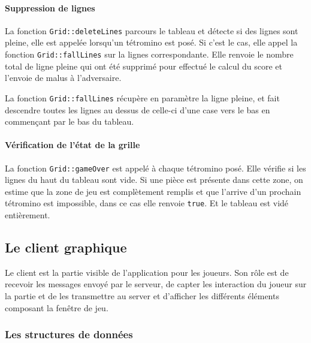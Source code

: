 \documentclass[a4paper, 12pt]{article}
\begin{document}
			\paragraph{Suppression de lignes}
				La fonction \texttt{Grid::deleteLines} parcours le tableau et détecte si des lignes sont pleine, elle est appelée lorsqu'un tétromino est posé.
				Si c’est le cas, elle appel la fonction \texttt{Grid::fallLines} sur la lignes correspondante.
				Elle renvoie le nombre total de ligne pleine qui ont été supprimé pour effectué le calcul du score et l’envoie de malus à l’adversaire.

				La fonction \texttt{Grid::fallLines} récupère en paramètre la ligne pleine, et fait descendre toutes les lignes au dessus de celle-ci d’une case vers le bas en commençant par le bas du tableau.

			\paragraph{Vérification de l’état de la grille}

				La fonction \texttt{Grid::gameOver} est appelé à chaque tétromino posé. Elle vérifie si les lignes du haut du tableau sont vide. Si une pièce est présente dans cette zone, on estime que la zone de jeu est complètement remplis et que l’arrive d’un prochain tétromino est impossible, dans ce cas elle renvoie \texttt{true}. Et le tableau est vidé entièrement.

	\subsection{Le client graphique}

		Le client est la partie visible de l’application pour les joueurs. Son rôle est de recevoir les messages envoyé par le serveur, de capter les interaction du joueur sur la partie et de les transmettre au server et d’afficher les différents éléments composant la fenêtre de jeu.

		\subsubsection{Les structures de données}
\end{document}
